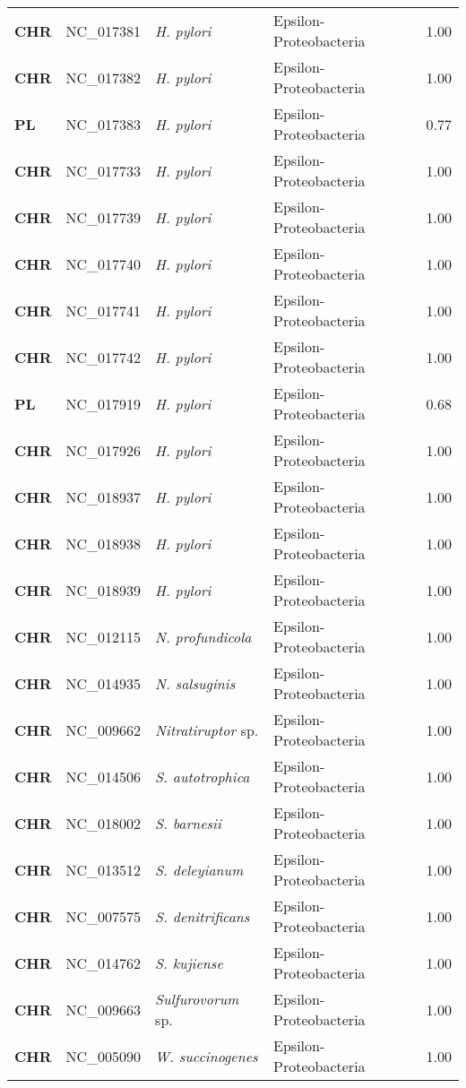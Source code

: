 \begin{adjustwidth}{-3cm}{2cm}
{\begin{supertabular}{>{\bfseries}l|p{0.1\textwidth}p{0.14\textwidth}l|l}
CHR & NC\_017381 & \textit{H. pylori} & Epsilon-Proteobacteria & 1.00\\
CHR & NC\_017382 & \textit{H. pylori} & Epsilon-Proteobacteria & 1.00\\
PL & NC\_017383 & \textit{H. pylori} & Epsilon-Proteobacteria & 0.77\\
CHR & NC\_017733 & \textit{H. pylori} & Epsilon-Proteobacteria & 1.00\\
CHR & NC\_017739 & \textit{H. pylori} & Epsilon-Proteobacteria & 1.00\\
CHR & NC\_017740 & \textit{H. pylori} & Epsilon-Proteobacteria & 1.00\\
CHR & NC\_017741 & \textit{H. pylori} & Epsilon-Proteobacteria & 1.00\\
CHR & NC\_017742 & \textit{H. pylori} & Epsilon-Proteobacteria & 1.00\\
PL & NC\_017919 & \textit{H. pylori} & Epsilon-Proteobacteria & 0.68\\
CHR & NC\_017926 & \textit{H. pylori} & Epsilon-Proteobacteria & 1.00\\
CHR & NC\_018937 & \textit{H. pylori} & Epsilon-Proteobacteria & 1.00\\
CHR & NC\_018938 & \textit{H. pylori} & Epsilon-Proteobacteria & 1.00\\
CHR & NC\_018939 & \textit{H. pylori} & Epsilon-Proteobacteria & 1.00\\
CHR & NC\_012115 & \textit{N. profundicola} & Epsilon-Proteobacteria & 1.00\\
CHR & NC\_014935 & \textit{N. salsuginis} & Epsilon-Proteobacteria & 1.00\\
CHR & NC\_009662 & \textit{Nitratiruptor} sp. & Epsilon-Proteobacteria & 1.00\\
CHR & NC\_014506 & \textit{S. autotrophica} & Epsilon-Proteobacteria & 1.00\\
CHR & NC\_018002 & \textit{S. barnesii} & Epsilon-Proteobacteria & 1.00\\
CHR & NC\_013512 & \textit{S. deleyianum} & Epsilon-Proteobacteria & 1.00\\
CHR & NC\_007575 & \textit{S. denitrificans} & Epsilon-Proteobacteria & 1.00\\
CHR & NC\_014762 & \textit{S. kujiense} & Epsilon-Proteobacteria & 1.00\\
CHR & NC\_009663 & \textit{Sulfurovorum} sp. & Epsilon-Proteobacteria & 1.00\\
CHR & NC\_005090 & \textit{W. succinogenes} & Epsilon-Proteobacteria & 1.00\\

\end{supertabular}}
\end{adjustwidth}
